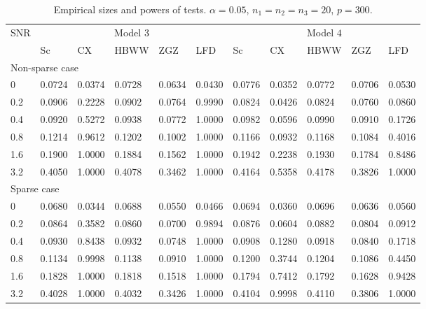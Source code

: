 \documentclass[12pt]{article} %
\theoremstyle{definition}
\begin{document}
\begin{table}[!hbp]
    \caption{Empirical sizes and powers of tests. $\alpha=0.05$, $n_1=n_2=n_3=20$, $p=300$. }
    \label{table2}
    \centering
    \begin{tabular}{*{11}{l}}
    \toprule
    \multirow{2}{*}{SNR} &\multicolumn{5}{c}{Model $3$}&
    \multicolumn{5}{c}{Model $4$} \\
        \cmidrule(r){2-6}\cmidrule(r){7-11}
& Sc & CX & HBWW & ZGZ & LFD & Sc & CX & HBWW & ZGZ & LFD \\ 
    \midrule
    \multicolumn{5}{l}{Non-sparse case}
    \\
    \midrule

0 & 0.0724 & 0.0374 & 0.0728 & 0.0634 & 0.0430 & 0.0776 & 0.0352 & 0.0772 & 0.0706 & 0.0530 \\ 
  0.2& 0.0906 & 0.2228 & 0.0902 & 0.0764 & 0.9990 & 0.0824 & 0.0426 & 0.0824 & 0.0760 & 0.0860 \\ 
  0.4& 0.0920 & 0.5272 & 0.0938 & 0.0772 & 1.0000 & 0.0982 & 0.0596 & 0.0990 & 0.0910 & 0.1726 \\ 
  0.8& 0.1214 & 0.9612 & 0.1202 & 0.1002 & 1.0000 & 0.1166 & 0.0932 & 0.1168 & 0.1084 & 0.4016 \\ 
  1.6& 0.1900 & 1.0000 & 0.1884 & 0.1562 & 1.0000 & 0.1942 & 0.2238 & 0.1930 & 0.1784 & 0.8486 \\ 
  3.2& 0.4050 & 1.0000 & 0.4078 & 0.3462 & 1.0000 & 0.4164 & 0.5358 & 0.4178 & 0.3826 & 1.0000 \\ 


    \midrule
    \multicolumn{5}{l}{Sparse case}
    \\
    \midrule

  0 & 0.0680 & 0.0344 & 0.0688 & 0.0550 & 0.0466 & 0.0694 & 0.0360 & 0.0696 & 0.0636 & 0.0560 \\ 
  0.2 & 0.0864 & 0.3582 & 0.0860 & 0.0700 & 0.9894 & 0.0876 & 0.0604 & 0.0882 & 0.0804 & 0.0912 \\ 
  0.4 & 0.0930 & 0.8438 & 0.0932 & 0.0748 & 1.0000 & 0.0908 & 0.1280 & 0.0918 & 0.0840 & 0.1718 \\ 
  0.8 & 0.1134 & 0.9998 & 0.1138 & 0.0910 & 1.0000 & 0.1200 & 0.3744 & 0.1204 & 0.1086 & 0.4450 \\ 
  1.6 & 0.1828 & 1.0000 & 0.1818 & 0.1518 & 1.0000 & 0.1794 & 0.7412 & 0.1792 & 0.1628 & 0.9428 \\ 
  3.2 & 0.4028 & 1.0000 & 0.4032 & 0.3426 & 1.0000 & 0.4104 & 0.9998 & 0.4110 & 0.3806 & 1.0000 \\ 



\bottomrule
\end{tabular}
\end{table}
\end{document}

